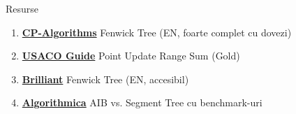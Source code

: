 \documentclass[10pt]{beamer}
\begin{document}
\begin{frame}{Resurse}
  \begin{enumerate}
    \item \href{https://cp-algorithms.com/data_structures/fenwick.html}{\textbf{CP-Algorithms}}
          \textemdash{} Fenwick Tree (EN, foarte complet cu dovezi)
    \item \href{https://usaco.guide/gold/PURS}{\textbf{USACO Guide}}
          \textemdash{} Point Update Range Sum (Gold)
    \item \href{https://brilliant.org/wiki/fenwick-tree/}{\textbf{Brilliant}}
          \textemdash{} Fenwick Tree (EN, accesibil)
    \item \href{https://en.algorithmica.org/hpc/data-structures/segment-trees/\#fenwick-trees}{\textbf{Algorithmica}}
          \textemdash{} AIB vs. Segment Tree cu benchmark-uri
  \end{enumerate}
\end{frame}
\end{document}
